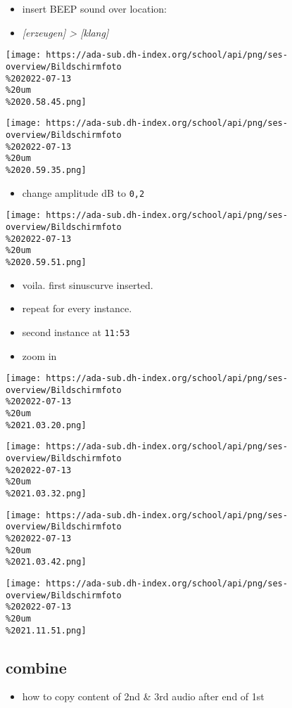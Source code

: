 \documentclass[
  12pt,
]{article}
\providecommand{\tightlist}{%
  \setlength{\itemsep}{0pt}\setlength{\parskip}{0pt}}
\begin{document}
\begin{itemize}
\tightlist
\item
  insert BEEP sound over location:
\item
  \emph{{[}erzeugen{]} \textgreater{} {[}klang{]}}
\end{itemize}

\texttt{[image: https://ada-sub.dh-index.org/school/api/png/ses-overview/Bildschirmfoto\\\%202022-07-13\\\%20um\\\%2020.58.45.png]}

\texttt{[image: https://ada-sub.dh-index.org/school/api/png/ses-overview/Bildschirmfoto\\\%202022-07-13\\\%20um\\\%2020.59.35.png]}

\begin{itemize}
\tightlist
\item
  change amplitude dB to \texttt{0,2}
\end{itemize}

\texttt{[image: https://ada-sub.dh-index.org/school/api/png/ses-overview/Bildschirmfoto\\\%202022-07-13\\\%20um\\\%2020.59.51.png]}

\begin{itemize}
\tightlist
\item
  voila. first sinuscurve inserted.
\item
  repeat for every instance.
\item
  second instance at \texttt{11:53}
\item
  zoom in
\end{itemize}

\texttt{[image: https://ada-sub.dh-index.org/school/api/png/ses-overview/Bildschirmfoto\\\%202022-07-13\\\%20um\\\%2021.03.20.png]}

\texttt{[image: https://ada-sub.dh-index.org/school/api/png/ses-overview/Bildschirmfoto\\\%202022-07-13\\\%20um\\\%2021.03.32.png]}

\texttt{[image: https://ada-sub.dh-index.org/school/api/png/ses-overview/Bildschirmfoto\\\%202022-07-13\\\%20um\\\%2021.03.42.png]}

\texttt{[image: https://ada-sub.dh-index.org/school/api/png/ses-overview/Bildschirmfoto\\\%202022-07-13\\\%20um\\\%2021.11.51.png]}

\hypertarget{combine}{%
\subsection{combine}\label{combine}}

\begin{itemize}
\tightlist
\item
  how to copy content of 2nd \& 3rd audio after end of 1st
\end{itemize}
\end{document}
